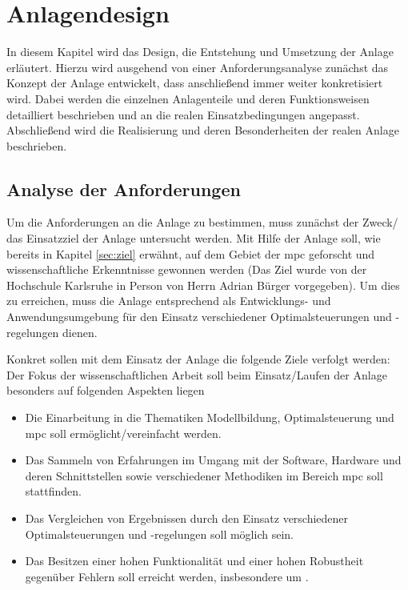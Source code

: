 %
%

\chapter{Anlagendesign}
\label{chap:anlagendesign}

In diesem Kapitel wird das Design, die Entstehung und Umsetzung der Anlage erläutert. Hierzu wird ausgehend von einer Anforderungsanalyse zunächst das Konzept der Anlage entwickelt, dass anschließend immer weiter konkretisiert wird. Dabei werden die einzelnen Anlagenteile und deren Funktionsweisen detailliert beschrieben und an die realen Einsatzbedingungen angepasst. Abschließend wird die Realisierung und deren Besonderheiten der realen Anlage beschrieben.

\section{Analyse der Anforderungen}
\label{sec:anforderungen}
Um die Anforderungen an die Anlage zu bestimmen, muss zunächst der Zweck/ das Einsatzziel der Anlage untersucht werden. Mit Hilfe der Anlage soll, wie bereits in Kapitel \ref{sec:ziel} erwähnt, auf dem Gebiet der \acrlong{mpc} geforscht und wissenschaftliche Erkenntnisse gewonnen werden (Das Ziel wurde von der Hochschule Karlsruhe in Person von Herrn Adrian Bürger vorgegeben). Um dies zu erreichen, muss die Anlage entsprechend als Entwicklungs- und Anwendungsumgebung für den Einsatz verschiedener Optimalsteuerungen und -regelungen dienen.

Konkret sollen mit dem Einsatz der Anlage die folgende Ziele verfolgt werden:
Der Fokus der wissenschaftlichen Arbeit soll beim Einsatz/Laufen der Anlage besonders auf folgenden Aspekten liegen
\begin{itemize}
	\item Die Einarbeitung in die Thematiken Modellbildung, Optimalsteuerung und \acrlong{mpc} soll ermöglicht/vereinfacht werden.
	\item Das Sammeln von Erfahrungen im Umgang mit der Software, Hardware und deren Schnittstellen sowie verschiedener Methodiken im Bereich \acrlong{mpc} soll stattfinden.
	\item Das Vergleichen von Ergebnissen durch den Einsatz verschiedener Optimalsteuerungen und -regelungen soll möglich sein.
	\item Das Besitzen einer hohen Funktionalität und einer hohen Robustheit gegenüber Fehlern soll erreicht werden, insbesondere um .
\end{itemize}

